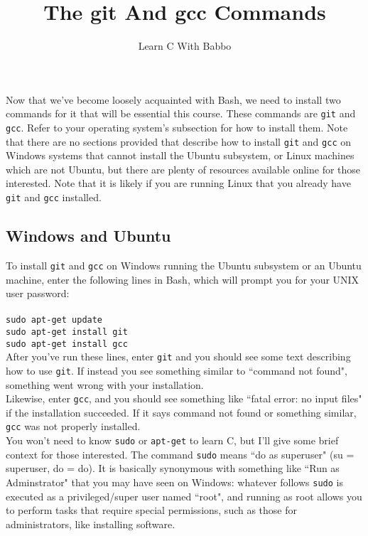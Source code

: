 \documentclass{article}
\begin{document}
\title{The git And gcc Commands}
\author{Learn C With Babbo}
\date{}
\maketitle

\section*{}
Now that we've become loosely acquainted with Bash, we need to install two commands for it that will be essential this
course. These commands are \verb|git| and \verb|gcc|. Refer to your operating system's subsection for how to install
them.  Note that there are no sections provided that describe how to install \verb|git| and \verb|gcc| on 
Windows systems that cannot install the Ubuntu subsystem, or Linux machines which
are not Ubuntu, but there are plenty of resources available online for those interested. Note that it is likely if you
are running Linux that you already have \verb|git| and \verb|gcc| installed. \\

\subsection*{Windows and Ubuntu}
To install \verb|git| and \verb|gcc| on Windows running the Ubuntu subsystem or an Ubuntu machine, 
enter the following lines in Bash, which will prompt you for your UNIX user password: \\ \\
\verb|sudo apt-get update| \\
\verb|sudo apt-get install git| \\
\verb|sudo apt-get install gcc| \\

After you've run these lines, enter \verb|git| and you should see some text describing how to use \verb|git|. 
If instead you see something similar to ``command not found", something went wrong with your installation. \\ 
Likewise, enter \verb|gcc|, and you should see something like ``fatal error: no input files" if the installation 
succeeded. If it says command not found or something similar, \verb|gcc| was not properly installed. \\

You won't need to know \verb|sudo| or \verb|apt-get| to learn C, but I'll give some brief context for those interested.
The command \verb|sudo| means ``do as superuser" (su = superuser, do = do). It is basically synonymous with something like
``Run as Adminstrator" that you may have seen on Windows: whatever follows \verb|sudo| is executed as a privileged/super
user named ``root", and running as root allows you to perform tasks that require special permissions, such as those for
administrators, like installing software. \\
\end{document}
